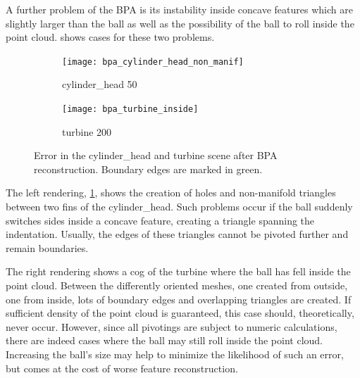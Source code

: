 A further problem of the BPA is its instability inside concave features which are slightly larger than the ball as well as the possibility of the ball to roll inside the point cloud.
 shows cases for these two problems.
%
\begin{figure}
	\centering
	\begin{subfigure}[b]{0.49\textwidth}
		\centering
		\texttt{[image: bpa\_cylinder\_head\_non\_manif]}
		\caption{cylinder\_head 50}
		\label{fig:bpa_cylinder_head_non_manif}
	\end{subfigure}
	\begin{subfigure}[b]{0.49\textwidth}
		\centering
		\texttt{[image: bpa\_turbine\_inside]}
		\caption{turbine 200}
		\label{fig:bpa_turbine_inside}
	\end{subfigure}
	\caption{
		Error in the cylinder\_head and turbine scene after BPA reconstruction.
		Boundary edges are marked in green.
	}
	\label{fig:bpa_issues}
\end{figure}

The left rendering, \cref{fig:bpa_cylinder_head_non_manif}, shows the creation of holes and non-manifold triangles between two fins of the cylinder\_head.
Such problems occur if the ball suddenly switches sides inside a concave feature, creating a triangle spanning the indentation.
Usually, the edges of these triangles cannot be pivoted further and remain boundaries.

The right rendering shows a cog of the turbine where the ball has fell inside the point cloud.
Between the differently oriented meshes, one created from outside, one from inside, lots of boundary edges and overlapping triangles are created.
If sufficient density of the point cloud is guaranteed, this case should, theoretically, never occur.
However, since all pivotings are subject to numeric calculations, there are indeed cases where the ball may still roll inside the point cloud.
Increasing the ball's size may help to minimize the likelihood of such an error, but comes at the cost of worse feature reconstruction.


